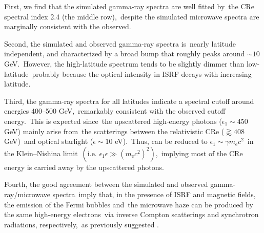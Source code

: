 \documentclass[twocolumn]{aastex631}
\begin{document}
First, we find that the simulated gamma-ray spectra are well fitted by\
the CRe spectral index 2.4 (the middle row),\
despite the simulated microwave spectra are marginally consistent with the observed.

Second, the simulated and observed gamma-ray spectra is\
nearly latitude independent, and characterized by a broad bump that roughly peaks around $\sim10$ GeV.\
However, the high-latitude spectrum tends to be slightly dimmer than low-latitude\
probably because the optical intensity in ISRF decays with increasing latitude.

Third, the gamma-ray spectra for all latitudes indicate a spectral cutoff around energies 400--500 GeV,\
remarkably consistent with the observed cutoff energy.\
This is expected since\
the upscattered high-energy photons ($\epsilon_{1}\sim450$ GeV) mainly arise from\
the scatterings between the relativistic CRe ($\gtrapprox 408$ GeV)\
and optical starlight ($\epsilon \sim 10$ eV).\
Thus,  can be reduced to $\epsilon_{1}\sim\gamma m_{\text{e}}c^2$\
in the Klein--Nishina limit\
$\left(\text{i.e. }\epsilon_{1}\epsilon \gg \left(m_{\text{e}}c^2\right)^2\right)$,\
implying most of the CRe energy is carried away by the upscattered photons.

Fourth, the good agreement between the simulated and observed gamma-ray/microwave spectra\
imply that, in the presence of ISRF and magnetic fields, the emission of the Fermi bubbles and\
the microwave haze can be produced by the same high-energy electrons\
via inverse Compton scatterings and synchrotron radiations, respectively,\
as previously suggested \citep{Su2010,Dobler2012}.
\end{document}
